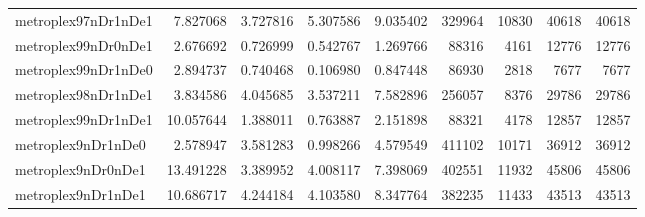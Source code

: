 \begin{longtable}{|l|r|r|r|r|r|r|r|r|}
metroplex97nDr1nDe1 & 7.827068 & 3.727816 & 5.307586 & 9.035402 & 329964 & 10830 & 40618 & 40618 \\
metroplex99nDr0nDe1 & 2.676692 & 0.726999 & 0.542767 & 1.269766 & 88316 & 4161 & 12776 & 12776 \\
metroplex99nDr1nDe0 & 2.894737 & 0.740468 & 0.106980 & 0.847448 & 86930 & 2818 & 7677 & 7677 \\
metroplex98nDr1nDe1 & 3.834586 & 4.045685 & 3.537211 & 7.582896 & 256057 & 8376 & 29786 & 29786 \\
metroplex99nDr1nDe1 & 10.057644 & 1.388011 & 0.763887 & 2.151898 & 88321 & 4178 & 12857 & 12857 \\
metroplex9nDr1nDe0 & 2.578947 & 3.581283 & 0.998266 & 4.579549 & 411102 & 10171 & 36912 & 36912 \\
metroplex9nDr0nDe1 & 13.491228 & 3.389952 & 4.008117 & 7.398069 & 402551 & 11932 & 45806 & 45806 \\
metroplex9nDr1nDe1 & 10.686717 & 4.244184 & 4.103580 & 8.347764 & 382235 & 11433 & 43513 & 43513 \\
\end{longtable}
